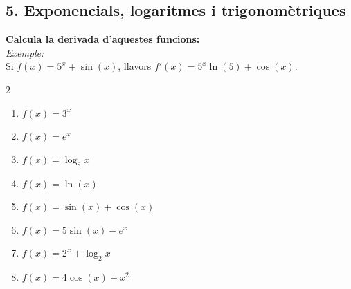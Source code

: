 \documentclass[12pt,a4paper]{article}
\begin{document}
\newpage 

\subsection*{5. Exponencials, logaritmes i trigonomètriques}
\textbf{Calcula la derivada d'aquestes funcions: } \\[0.2cm]
\textit{Exemple:} \\[0.2cm] 
Si $f(x) = 5^x + \sin(x)$, llavors $f'(x) = 5^x \ln(5) + \cos(x)$.

\begin{multicols}{2}
\begin{enumerate}[label=\alph*)]
    \item $f(x) = 3^x$
    \item $f(x) = e^x$
    \item $f(x) = \log_8 x$
    \item $f(x) = \ln(x)$
    \item $f(x) = \sin(x) + \cos(x)$
    \item $f(x) = 5\sin(x) - e^x$
    \item $f(x) = 2^x + \log_2 x$
    \item $f(x) = 4\cos(x) + x^2$
\end{enumerate}
\end{multicols}

\newpage
\end{document}
